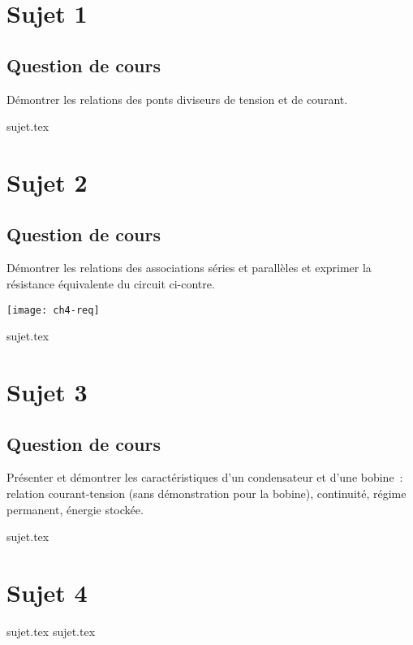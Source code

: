 \documentclass[a4paper, 11pt]{book}
\begin{document}
\resetQ
\newpage

\chapter{Sujet 1}
\section{Question de cours}

Démontrer les relations des ponts diviseurs de tension et de courant.

{sujet.tex}

\resetQ
\newpage

\chapter{Sujet 2}
\section{Question de cours}

\begin{minipage}{0.45\linewidth} Démontrer les relations des associations séries
    et parallèles et exprimer la résistance équivalente du circuit ci-contre.
\end{minipage}
\begin{minipage}{0.45\linewidth}
    \begin{center}
        \texttt{[image: ch4-req]}
    \end{center}
\end{minipage}

{sujet.tex}

\resetQ
\newpage

\chapter{Sujet 3}
\section{Question de cours}

Présenter et démontrer les caractéristiques d'un condensateur et d'une bobine~:
relation courant-tension (sans démonstration pour la bobine), continuité, régime
permanent, énergie stockée.

{sujet.tex}

\resetQ
\newpage

\chapter{Sujet 4}

\resetQ
{sujet.tex}
{sujet.tex}
\end{document}
